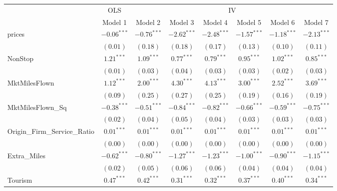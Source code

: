 
\begin{tabular}{l c c c c c c c}
\toprule
 & \multicolumn{1}{c}{OLS} & \multicolumn{6}{c}{IV} \\
\cmidrule(lr){2-2} \cmidrule(lr){3-8}
 & Model 1 & Model 2 & Model 3 & Model 4 & Model 5 & Model 6 & Model 7 \\
\midrule
prices                       & $-0.06^{***}$ & $-0.76^{***}$ & $-2.62^{***}$ & $-2.48^{***}$ & $-1.57^{***}$    & $-1.18^{***}$ & $-2.13^{***}$  \\
                             & $(0.01)$      & $(0.18)$      & $(0.18)$      & $(0.17)$      & $(0.13)$         & $(0.10)$      & $(0.11)$       \\
NonStop                      & $1.21^{***}$  & $1.09^{***}$  & $0.77^{***}$  & $0.79^{***}$  & $0.95^{***}$     & $1.02^{***}$  & $0.85^{***}$   \\
                             & $(0.01)$      & $(0.03)$      & $(0.04)$      & $(0.03)$      & $(0.03)$         & $(0.02)$      & $(0.03)$       \\
MktMilesFlown                & $1.12^{***}$  & $2.00^{***}$  & $4.30^{***}$  & $4.13^{***}$  & $3.00^{***}$     & $2.52^{***}$  & $3.69^{***}$   \\
                             & $(0.09)$      & $(0.25)$      & $(0.27)$      & $(0.25)$      & $(0.19)$         & $(0.16)$      & $(0.19)$       \\
MktMilesFlown\_Sq            & $-0.38^{***}$ & $-0.51^{***}$ & $-0.84^{***}$ & $-0.82^{***}$ & $-0.66^{***}$    & $-0.59^{***}$ & $-0.75^{***}$  \\
                             & $(0.02)$      & $(0.04)$      & $(0.05)$      & $(0.04)$      & $(0.03)$         & $(0.03)$      & $(0.03)$       \\
Origin\_Firm\_Service\_Ratio & $0.01^{***}$  & $0.01^{***}$  & $0.01^{***}$  & $0.01^{***}$  & $0.01^{***}$     & $0.01^{***}$  & $0.01^{***}$   \\
                             & $(0.00)$      & $(0.00)$      & $(0.00)$      & $(0.00)$      & $(0.00)$         & $(0.00)$      & $(0.00)$       \\
Extra\_Miles                 & $-0.62^{***}$ & $-0.80^{***}$ & $-1.27^{***}$ & $-1.23^{***}$ & $-1.00^{***}$    & $-0.90^{***}$ & $-1.15^{***}$  \\
                             & $(0.02)$      & $(0.05)$      & $(0.06)$      & $(0.06)$      & $(0.04)$         & $(0.04)$      & $(0.04)$       \\
Tourism                      & $0.47^{***}$  & $0.42^{***}$  & $0.31^{***}$  & $0.32^{***}$  & $0.37^{***}$     & $0.40^{***}$  & $0.34^{***}$   \\

\end{tabular}
